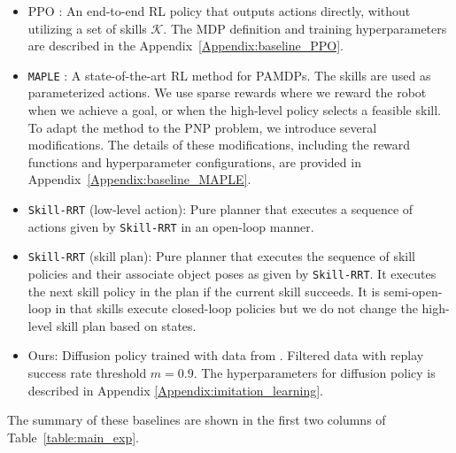 \begin{itemize}
    \item PPO \cite{schulman2017proximal}: An end-to-end RL policy that outputs actions directly, without utilizing a set of skills $\mathcal{K}$. The MDP definition and training hyperparameters are described in the Appendix~\ref{Appendix:baseline_PPO}.

    \item \texttt{MAPLE} \cite{nasiriany2022augmenting}: A state-of-the-art RL method for PAMDPs. The skills are used as parameterized actions. We use sparse rewards where we reward the robot when we achieve a goal, or when the high-level policy selects a feasible skill. To adapt the method to the PNP problem, we introduce several modifications. The details of these modifications, including the reward functions and hyperparameter configurations, are provided in Appendix~\ref{Appendix:baseline_MAPLE}.
        
    \item \texttt{Skill-RRT} (low-level action): Pure planner that executes a sequence of actions given by \texttt{Skill-RRT} in an open-loop manner.
    
    \item \texttt{Skill-RRT} (skill plan): Pure planner that executes the sequence of skill policies and their associate object poses as given by \texttt{Skill-RRT}. It executes the next skill policy in the plan if the current skill succeeds. It is semi-open-loop in that skills execute closed-loop policies but we do not change the high-level skill plan based on states.

    \item Ours: Diffusion policy trained with data from \skillrrt. Filtered data with replay success rate threshold $m=0.9$. The hyperparameters for diffusion policy is described in Appendix \ref{Appendix:imitation_learning}.
\end{itemize}
The summary of these baselines are shown in the first two columns of Table~\ref{table:main_exp}. 
